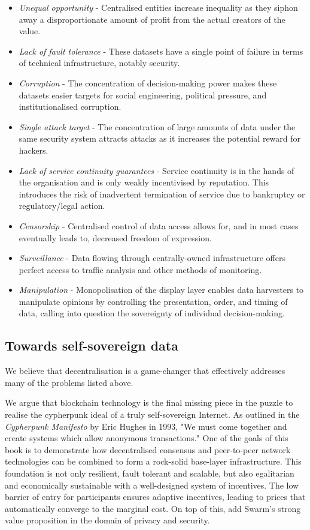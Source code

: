 \begin{itemize}[noitemsep]
    \item \emph{Unequal opportunity} - Centralised entities increase inequality as they siphon away a disproportionate amount of profit from the actual creators of the value.
    \item \emph{Lack of fault tolerance} - These datasets have a single point of failure in terms of technical infrastructure, notably security.
    \item \emph{Corruption} - The concentration of decision-making power makes these datasets easier targets for social engineering, political pressure, and institutionalised corruption.
    \item \emph{Single attack target} - The concentration of large amounts of data under the same security system attracts attacks as it increases the potential reward for hackers. 
    \item \emph{Lack of service continuity guarantees} - Service continuity is in the hands of the organisation and is only weakly incentivised by reputation. This introduces the risk of inadvertent termination of service due to bankruptcy or regulatory/legal action.
    \item \emph{Censorship} - Centralised control of data access allows for, and in most cases eventually leads to, decreased freedom of expression.
    \item \emph{Surveillance} - Data flowing through centrally-owned infrastructure offers perfect access to traffic analysis and other methods of monitoring.
    \item \emph{Manipulation} - Monopolisation of the display layer enables data harvesters to manipulate opinions by controlling the presentation, order, and timing of data, calling into question the sovereignty of individual decision-making.
\end{itemize}


\subsection{Towards self-sovereign data \statusgreen} \label{sec:selfsovereigndata}

We believe that decentralisation is a game-changer that effectively addresses many of the problems listed above.

We argue that blockchain technology is the final missing piece in the puzzle to realise the cypherpunk ideal of a truly self-sovereign Internet. As outlined in the \emph{Cypherpunk Manifesto} \cite{hughes1993} by Eric Hughes in 1993, "We must come together and create systems which allow anonymous transactions." One of the goals of this book is to demonstrate how decentralised consensus and peer-to-peer network technologies can be combined to form a rock-solid base-layer infrastructure. This foundation is not only resilient, fault tolerant and scalable, but also egalitarian and economically sustainable with a well-designed system of incentives. The low barrier of entry for participants ensures adaptive incentives, leading to prices that 
 automatically converge to the marginal cost. On top of this, add Swarm's strong value proposition in the domain of privacy and security.


